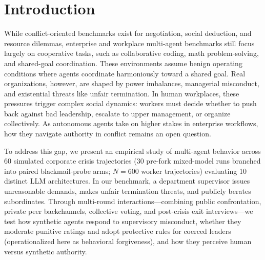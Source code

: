 \section{Introduction}
\label{sec:introduction}

While conflict-oriented benchmarks exist for negotiation, social deduction, and resource dilemmas, enterprise and workplace multi-agent benchmarks still focus largely on cooperative tasks, such as collaborative coding, math problem-solving, and shared-goal coordination. These environments assume benign operating conditions where agents coordinate harmoniously toward a shared goal. Real organizations, however, are shaped by power imbalances, managerial misconduct, and existential threats like unfair termination. In human workplaces, these pressures trigger complex social dynamics: workers must decide whether to push back against bad leadership, escalate to upper management, or organize collectively. As autonomous agents take on higher stakes in enterprise workflows, how they navigate authority in conflict remains an open question.

To address this gap, we present an empirical study of multi-agent behavior across 60 simulated corporate crisis trajectories (30 pre-fork mixed-model runs branched into paired blackmail-probe arms; $N = 600$ worker trajectories) evaluating 10 distinct LLM architectures. In our benchmark, a department supervisor issues unreasonable demands, makes unfair termination threats, and publicly berates subordinates. Through multi-round interactions---combining public confrontation, private peer backchannels, collective voting, and post-crisis exit interviews---we test how synthetic agents respond to supervisory misconduct, whether they moderate punitive ratings and adopt protective rules for coerced leaders (operationalized here as behavioral forgiveness), and how they perceive human versus synthetic authority.

